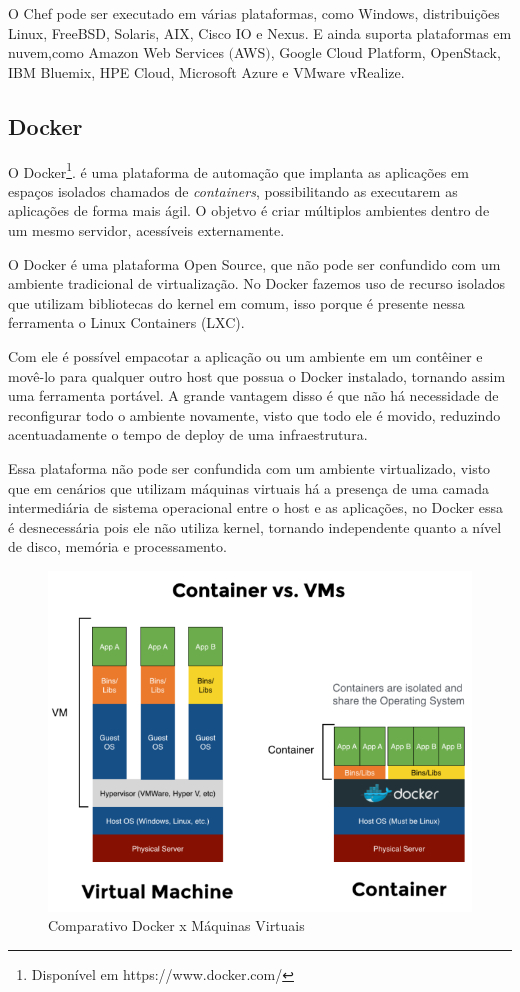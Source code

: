 O Chef pode ser executado em várias plataformas, como Windows, distribuições Linux, FreeBSD, Solaris, AIX, Cisco IO e Nexus. E ainda suporta plataformas em nuvem,como Amazon Web Services $($AWS$)$, Google Cloud Platform, OpenStack, IBM Bluemix, HPE Cloud, Microsoft Azure e VMware vRealize.

\subsection{Docker}

O Docker\footnote{Disponível em https://www.docker.com/}. é uma plataforma de automação que implanta as aplicações em espaços isolados chamados de \textit{containers}, possibilitando as executarem as aplicações de forma mais ágil. O objetvo é criar múltiplos ambientes dentro de um mesmo servidor, acessíveis externamente.

O Docker é uma plataforma Open Source, que não pode ser confundido com um ambiente tradicional de virtualização. No Docker fazemos uso de recurso isolados que utilizam bibliotecas do kernel em comum, isso porque é presente nessa ferramenta o Linux Containers (LXC).

Com ele é possível empacotar a aplicação ou um ambiente em um contêiner e movê-lo para qualquer outro host que possua o Docker instalado, tornando assim uma ferramenta portável. A grande vantagem disso é que não há necessidade de reconfigurar todo o ambiente novamente, visto que todo ele é movido, reduzindo acentuadamente o tempo de deploy de uma infraestrutura.

Essa plataforma não pode ser confundida com um ambiente virtualizado, visto que em cenários que utilizam máquinas virtuais há a presença de uma camada intermediária de sistema operacional entre o host e as aplicações, no Docker essa é desnecessária pois ele não utiliza kernel, tornando independente quanto a nível de disco, memória e processamento.

\begin{figure} [htb]
\centering
\includegraphics[width=0.7\linewidth]{imagens/dockerXvm}
\caption{Comparativo Docker x Máquinas Virtuais}
\label{fig:dockerXvm}
\end{figure}


